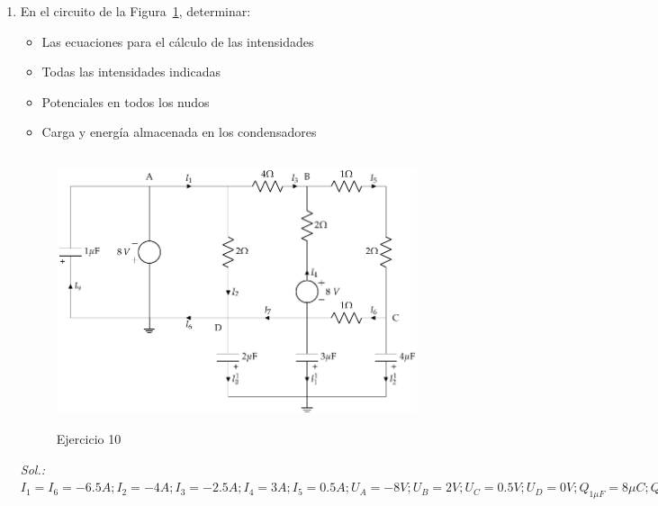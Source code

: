 \begin{enumerate}
\item En el circuito de la Figura~\ref{fig.ej11_BT1}, determinar:
\begin{itemize}
    \item Las ecuaciones para el cálculo de las intensidades
    \item Todas las intensidades indicadas
    \item Potenciales en todos los nudos
    \item Carga y energía almacenada en los condensadores
\end{itemize}
\begin{figure}[H]
    \centering
    \includegraphics[height=8cm]{../figs/ej11_BT1.pdf}
    \caption{Ejercicio 10}
    \label{fig.ej11_BT1}
\end{figure}
\emph{Sol.: $I_1=I_6=-6.5A; I_2=-4A; I_3=-2.5A; I_4=3A; I_5=0.5A; U_A=-8V; U_B=2V; U_C=0.5V; U_D=0V;Q_{1\mu F}=8\mu C; Q_{2\mu F}=Q_{3\mu F}=0\mu C; Q_{4\mu F}=-2\mu C; E_{1\mu F}=32\mu F; E_{2\mu F}=E_{3\mu F}=0 J; E_{4\mu F}=0.5\mu C$}


\end{enumerate}
